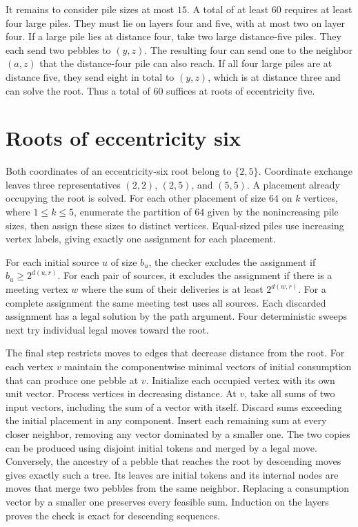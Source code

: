 \documentclass[10pt]{article}
\begin{document}
It remains to consider pile sizes at most $15$. A total of at least
$60$ requires at least four large piles. They must lie on layers
four and five, with at most two on layer four. If a large pile lies
at distance four, take two large distance-five piles. They each send
two pebbles to $(y,z)$. The resulting four can send one to the
neighbor $(a,z)$ that the distance-four pile can also reach. If
all four large piles are at distance five, they send eight in total
to $(y,z)$, which is at distance three and can solve the root.
Thus a total of $60$ suffices at roots of eccentricity five.

\section{Roots of eccentricity six}

Both coordinates of an eccentricity-six root belong to $\{2,5\}$.
Coordinate exchange leaves three representatives $(2,2)$, $(2,5)$,
and $(5,5)$. A placement already occupying the root is solved.
For each other placement of size $64$ on $k$ vertices, where
$1\leq k\leq5$, enumerate the partition of $64$ given by the
nonincreasing pile sizes, then assign these sizes to distinct
vertices. Equal-sized piles use increasing vertex labels, giving
exactly one assignment for each placement.

For each initial source $u$ of size $b_u$, the checker excludes
the assignment if $b_u\geq 2^{d(u,r)}$. For each pair of sources,
it excludes the assignment if there is a meeting vertex $w$
where the sum of their deliveries is at least $2^{d(w,r)}$.
For a complete assignment the same meeting test uses all sources.
Each discarded assignment has a legal solution by the path
argument. Four deterministic sweeps next try individual legal
moves toward the root.

The final step restricts moves to edges that decrease distance
from the root. For each vertex $v$ maintain the componentwise
minimal vectors of initial consumption that can produce one pebble
at $v$. Initialize each occupied vertex with its own unit vector.
Process vertices in decreasing distance. At $v$, take all sums of
two input vectors, including the sum of a vector with itself.
Discard sums exceeding the initial placement in any component.
Insert each remaining sum at every closer neighbor, removing any
vector dominated by a smaller one. The two copies can be produced
using disjoint initial tokens and merged by a legal move. Conversely,
the ancestry of a pebble that reaches the root by descending moves
gives exactly such a tree. Its leaves are initial tokens and its
internal nodes are moves that merge two pebbles from the same
neighbor. Replacing a consumption vector by a smaller one
preserves every feasible sum. Induction on the layers proves the
check is exact for descending sequences.
\end{document}
